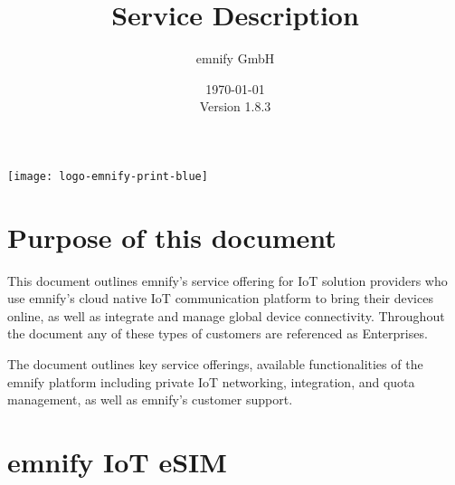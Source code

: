 \documentclass[11pt, oneside]{article}   	%
\newcommand{\addspace}{\vspace{2mm}}
\begin{document}
\title{Service Description}
\author{emnify GmbH}
\date{\today \\ \addspace Version 1.8.3}
\maketitle

\begin{center}
  \texttt{[image: logo-emnify-print-blue]}
\end{center}

\pagebreak[4]

\tableofcontents

\pagebreak[4]

\section{Purpose of this document}

\begin{markdown}

This document outlines emnify's service offering for IoT solution providers who use emnify's cloud native IoT communication platform to bring their devices online, as well as integrate and manage global device connectivity.
Throughout the document any of these types of customers are referenced as Enterprises. 

The document outlines key service offerings, available functionalities of the emnify platform including private IoT networking, integration, and quota management, as well as emnify's customer support.  

\end{markdown}

\section{emnify IoT eSIM}
\end{document}
